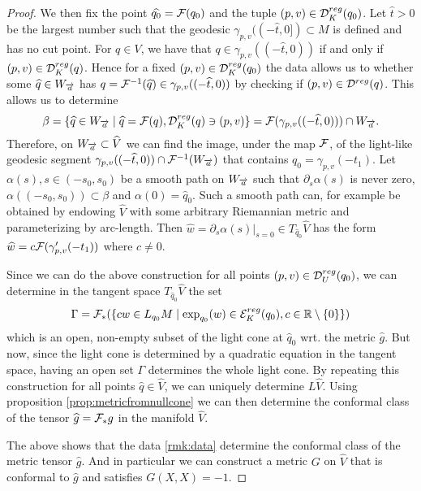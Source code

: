 \begin{proof}
    We then fix the point $\widehat{q_0}=\F(q_0)$ and the tuple $(p,v)\in \mc{D}^{reg}_K(q_0)$. Let $\widehat{t} >0$ be the largest number such that the geodesic $\gamma_{p,v}((-\widehat{t},0])\subset M$ is defined and has no cut point. For $q\in V$, we have that $q\in \gamma_{p,v}((-\widehat{t},0))$ if and only if $(p,v)\in \mc{D}^{reg}_K(q)$. Hence for a fixed $(p,v)\in \mc{D}^{reg}_K(q_0)$ the data allows us to whether some $\widehat{q}\in W_\aa$ has $q=\F^{-1}(\widehat{q}) \in \gamma_{p,v}((-\widehat{t},0))$ by checking if $(p,v)\in \mc{D}^{reg}(q)$. This allows us to determine
        \[
        \beta = \{ \widehat{q}\in W_\aa \mid \widehat{q}=\F(q), \mc{D}^{reg}_K(q) \ni (p,v)\} = \F(\gamma_{p,v}((-\widehat{t},0))) \cap W_\aa.
    \]
    Therefore, on $W_\aa\subset \widehat{V}$ we can find the image, under the map $\F$, of the light-like geodesic segment $\gamma_{p,v}((-\widehat{t},0))\cap \F^{-1}(W_\aa)$ that contains $q_0=\gamma_{p,v}(-t_1)$. Let $\alpha(s), s\in (-s_0,s_0)$ be a smooth path on $W_\aa$ such that $\partial_s\alpha(s)$ is never zero, $\alpha((-s_0,s_0))\subset \beta$ and $\alpha(0) = \widehat{q}_0$. Such a smooth path can, for example be obtained by endowing $\widehat{V}$ with some arbitrary Riemannian metric and parameterizing by arc-length. Then $\widehat{w}=\partial_s\alpha(s)\rvert_{s=0}\in T_{\widehat{q}_0}\widehat{V}$ has the form $\widehat{w}=c\F(\gamma'_{p,v}(-t_1))$ where $c\neq 0$. 
    
    Since we can do the above construction for all points $(p,v)\in \mc{D}^{reg}_U(q_0)$, we can determine in the tangent space $T_{\widehat{q}_0}\widehat{V}$ the set 
    \[
    \Gamma = \F_*(\{cw\in L_{q_0}M \mid \exp_{q_0}(w) \in \er(q_0), c\in \R\setminus \{0\}\}) 
    \]
    which is an open, non-empty subset of the light cone at $\widehat{q}_0$ wrt. the metric $\widehat{g}$. But now, since the light cone is determined by a quadratic equation in the tangent space, having an open set $\Gamma$ determines the whole light cone. By repeating this construction for all points $\widehat{q}\in \widehat{V}$, we can uniquely determine $L\widehat{V}$. Using proposition \ref{prop:metricfromnullcone} we can then determine the conformal class of the tensor $\widehat{g}=\F_*g$ in the manifold $\widehat{V}$.
    
    The above shows that the data \ref{rmk:data} determine the conformal class of the metric tensor $\widehat{g}$. And in particular we can construct a metric $G$ on $\widehat{V}$ that is conformal to $\widehat{g}$ and satisfies $G(X,X)=-1$.
\end{proof}


